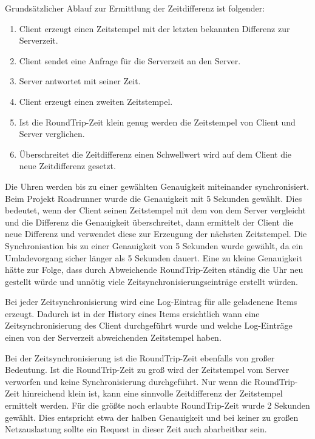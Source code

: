 Grundsätzlicher Ablauf zur Ermittlung der Zeitdifferenz ist folgender:
\begin{enumerate}
\item Client erzeugt einen Zeitstempel mit der letzten bekannten Differenz zur Serverzeit.
\item Client sendet eine Anfrage für die Serverzeit an den Server.
\item Server antwortet mit seiner Zeit.
\item Client erzeugt einen zweiten Zeitstempel.
\item Ist die RoundTrip-Zeit klein genug werden die Zeitstempel von Client und Server verglichen.
\item Überschreitet die Zeitdifferenz einen Schwellwert wird auf dem Client die neue Zeitdifferenz gesetzt.
\end{enumerate}

\par
Die Uhren werden bis zu einer gewählten Genauigkeit miteinander synchronisiert. Beim Projekt Roadrunner wurde die Genauigkeit mit 5 Sekunden gewählt. Dies bedeutet, wenn der Client seinen Zeitstempel mit dem von dem Server vergleicht und die Differenz die Genauigkeit überschreitet, dann ermittelt der Client die neue Differenz und verwendet diese zur Erzeugung der nächsten Zeitstempel. Die Synchronisation bis zu einer Genauigkeit von 5 Sekunden wurde gewählt, da ein Umladevorgang sicher länger als 5 Sekunden dauert. Eine zu kleine Genauigkeit hätte zur Folge, dass durch Abweichende RoundTrip-Zeiten ständig die Uhr neu gestellt würde und unnötig viele Zeitsynchronisierungseinträge erstellt würden.
\par
Bei jeder Zeitsynchronisierung wird eine Log-Eintrag für alle geladenene Items erzeugt. Dadurch ist in der History eines Items ersichtlich wann eine Zeitsynchronisierung des Client durchgeführt wurde und welche Log-Einträge einen von der Serverzeit abweichenden Zeitstempel haben.
\par
Bei der Zeitsynchronisierung ist die RoundTrip-Zeit ebenfalls von großer Bedeutung. Ist die RoundTrip-Zeit zu groß wird der Zeitstempel vom Server verworfen und keine Synchronisierung durchgeführt. Nur wenn die RoundTrip-Zeit hinreichend klein ist, kann eine sinnvolle Zeitdifferenz der Zeitstempel ermittelt werden. Für die größte noch erlaubte RoundTrip-Zeit wurde 2 Sekunden gewählt. Dies entspricht etwa der halben Genauigkeit und bei keiner zu großen Netzauslastung sollte ein Request in dieser Zeit auch abarbeitbar sein.

